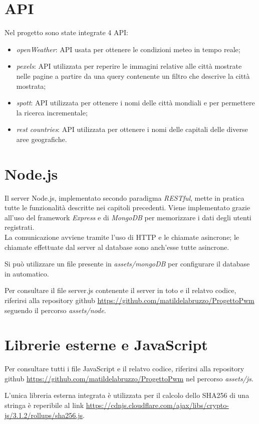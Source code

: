 \section{API}

Nel progetto sono state integrate 4 API:
\begin{itemize}
    \item \emph{openWeather}: API usata per ottenere le condizioni meteo in tempo reale;
    \item \emph{pexels}: API utilizzata per reperire le immagini relative alle città mostrate nelle pagine a partire da una query contenente un filtro che descrive la città mostrata;
    \item \emph{spott}: API utilizzata per ottenere i nomi delle città mondiali e per permettere la ricerca incrementale;
    \item \emph{rest countries}: API utilizzata per ottenere i nomi delle capitali delle diverse aree geografiche.
\end{itemize}

\section{Node.js}

Il server Node.js, implementato secondo paradigma \emph{RESTful}, mette in pratica tutte le funzionalità descritte nei capitoli precedenti. Viene implementato
grazie all'uso del framework \emph{Express} e di \emph{MongoDB} per memorizzare i dati degli utenti registrati.\\
La comunicazione avviene tramite l'uso di HTTP e le chiamate asincrone; le chiamate effettuate dal server al database sono anch'esse tutte asincrone.

\vspace{5mm}

Si può utilizzare un file presente in \emph{assets/mongoDB} per configurare il database in automatico.

\vspace{5mm}

Per consultare il file server.js contenente il server in toto e il relatvo codice,
riferirsi alla repository github \url{https://github.com/matildelabruzzo/ProgettoPwm} seguendo il percorso \emph{assets/node}.

\section{Librerie esterne e JavaScript}

Per consultare tutti i file JavaScript e il relatvo codice, riferirsi alla repository github \url{https://github.com/matildelabruzzo/ProgettoPwm}
nel percorso \emph{assets/js}.

L'unica libreria esterna integrata è utilizzata per il calcolo dello SHA256 di una stringa è reperibile al link \url{https://cdnjs.cloudflare.com/ajax/libs/crypto-js/3.1.2/rollups/sha256.js}.